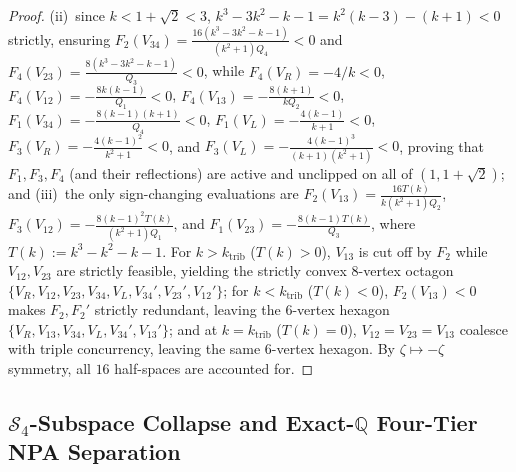 \documentclass[11pt,a4paper]{article}
\newcommand{\QQ}{\mathbb{Q}}
\newcommand{\calS}{\mathcal{S}}
\begin{document}
\begin{proof}
(ii)~since $k < 1+\sqrt{2} < 3$, $k^3 - 3k^2 - k - 1 = k^2(k-3) - (k+1) < 0$ strictly, ensuring $F_2(V_{34}) = \frac{16(k^3-3k^2-k-1)}{(k^2+1)Q_4} < 0$ and $F_4(V_{23}) = \frac{8(k^3-3k^2-k-1)}{Q_3} < 0$, while $F_4(V_R) = -4/k < 0$, $F_4(V_{12}) = -\frac{8k(k-1)}{Q_1} < 0$, $F_4(V_{13}) = -\frac{8(k+1)}{k Q_2} < 0$, $F_1(V_{34}) = -\frac{8(k-1)(k+1)}{Q_4} < 0$, $F_1(V_L) = -\frac{4(k-1)}{k+1} < 0$, $F_3(V_R) = -\frac{4(k-1)^2}{k^2+1} < 0$, and $F_3(V_L) = -\frac{4(k-1)^3}{(k+1)(k^2+1)} < 0$, proving that $F_1, F_3, F_4$ (and their reflections) are active and unclipped on all of $(1, 1+\sqrt{2})$;
and (iii)~the only sign-changing evaluations are $F_2(V_{13}) = \frac{16 T(k)}{k(k^2+1)Q_2}$, $F_3(V_{12}) = -\frac{8(k-1)^2 T(k)}{(k^2+1)Q_1}$, and $F_1(V_{23}) = -\frac{8(k-1) T(k)}{Q_3}$, where $T(k) := k^3 - k^2 - k - 1$.
For $k > k_{\mathrm{trib}}$ ($T(k) > 0$), $V_{13}$ is cut off by $F_2$ while $V_{12}, V_{23}$ are strictly feasible, yielding the strictly convex 8-vertex octagon $\{V_R, V_{12}, V_{23}, V_{34}, V_L, V_{34}', V_{23}', V_{12}'\}$; for $k < k_{\mathrm{trib}}$ ($T(k) < 0$), $F_2(V_{13}) < 0$ makes $F_2, F_2'$ strictly redundant, leaving the 6-vertex hexagon $\{V_R, V_{13}, V_{34}, V_L, V_{34}', V_{13}'\}$; and at $k = k_{\mathrm{trib}}$ ($T(k) = 0$), $V_{12} = V_{23} = V_{13}$ coalesce with triple concurrency, leaving the same 6-vertex hexagon. By $\zeta \mapsto -\zeta$ symmetry, all $16$ half-spaces are accounted for.
\end{proof}

\subsection{\texorpdfstring{$\calS_4$}{S\_4}-Subspace Collapse and Exact-\texorpdfstring{$\QQ$}{Q} Four-Tier NPA Separation}
\end{document}
